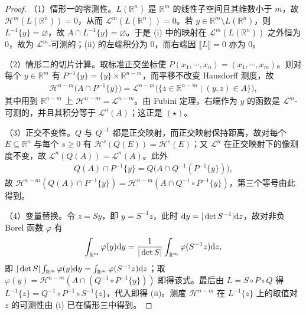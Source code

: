 \documentclass[../../main.tex]{subfiles}%
\begin{document}
\begin{proof}
（1）情形一的零测性。$L(\mathbb{R}^n)$ 是 $\mathbb{R}^m$ 的线性子空间且其维数小于 $m$，故 $\mathcal{H}^m(L(\mathbb{R}^n))=0$，从而 $\mathcal{L}^m(L(\mathbb{R}^n))=0$。若 $y\in\mathbb{R}^m\setminus L(\mathbb{R}^n)$，则 $L^{-1}\{y\}=\varnothing$，故 $A\cap L^{-1}\{y\}=\varnothing$。于是 (i) 中的映射在 $\mathcal{L}^m(L(\mathbb{R}^n))$ 之外恒为 $0$，故为 $\mathcal{L}^m$-可测的；(ii) 的左端积分为 $0$，而右端因 $\llbracket L\rrbracket=0$ 亦为 $0$。

（2）情形二的切片计算。取标准正交坐标使 $P(x_1,\cdots,x_n)=(x_1,\cdots,x_m)$。则对每个 $y\in\mathbb{R}^m$ 有 $P^{-1}\{y\}=\{y\}\times\mathbb{R}^{n-m}$，而平移不改变 Hausdorff 测度，故
\begin{align*}
\mathcal{H}^{n-m}\bigl(A\cap P^{-1}\{y\}\bigr)=\mathcal{L}^{n-m}\bigl(\{z\in\mathbb{R}^{n-m}\mid(y,z)\in A\}\bigr),
\end{align*}
其中用到 $\mathbb{R}^{n-m}$ 上 $\mathcal{H}^{n-m}=\mathcal{L}^{n-m}$。由 Fubini 定理，右端作为 $y$ 的函数是 $\mathcal{L}^m$-可测的，并且其积分等于 $\mathcal{L}^n(A)$；这正是 $(\star)$。

（3）正交不变性。$Q$ 与 $Q^{-1}$ 都是正交映射，而正交映射保持距离，故对每个 $E\subseteq\mathbb{R}^n$ 与每个 $s\geqslant0$ 有 $\mathcal{H}^s(Q(E))=\mathcal{H}^s(E)$；又 $\mathcal{L}^n$ 在正交映射下的像测度不变，故 $\mathcal{L}^n(Q(A))=\mathcal{L}^n(A)$。此外
\begin{align*}
Q(A)\cap P^{-1}\{y\}=Q\bigl(A\cap Q^{-1}(P^{-1}\{y\})\bigr),
\end{align*}
故 $\mathcal{H}^{n-m}(Q(A)\cap P^{-1}\{y\})=\mathcal{H}^{n-m}(A\cap Q^{-1}\circ P^{-1}\{y\})$，第三个等号由此得到。

（4）变量替换。令 $z=Sy$，即 $y=S^{-1}z$，此时 $\mathrm{d} y=|\det S^{-1}|\mathrm{d} z$，故对非负 Borel 函数 $\varphi$ 有
\begin{align*}
\int_{\mathbb{R}^m}\varphi(y)\mathrm{d} y=\frac{1}{|\det S|}\int_{\mathbb{R}^m}\varphi(S^{-1}z)\mathrm{d} z,
\end{align*}
即 $|\det S|\int_{\mathbb{R}^m}\varphi(y)\mathrm{d} y=\int_{\mathbb{R}^m}\varphi(S^{-1}z)\mathrm{d} z$；取 $\varphi(y)=\mathcal{H}^{n-m}(A\cap(Q^{-1}\circ P^{-1}\{y\}))$ 即得该式。最后由 $L=S\circ P\circ Q$ 得 $L^{-1}\{z\}=Q^{-1}\circ P^{-1}\circ S^{-1}\{z\}$，代入即得 (ii)。测度 $\mathcal{H}^{n-m}$ 在 $L^{-1}\{z\}$ 上的取值对 $z$ 的可测性由 (i) 已在情形三中得到。
\end{proof}
\end{document}
